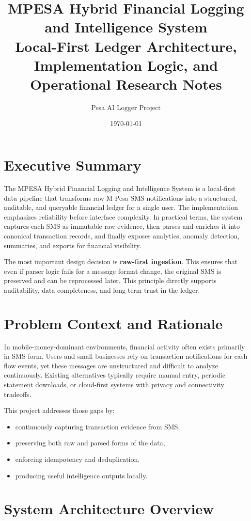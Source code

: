 \documentclass[12pt,a4paper]{article}
\title{MPESA Hybrid Financial Logging and Intelligence System \\
\large Local-First Ledger Architecture, Implementation Logic, and Operational Research Notes}
\author{Pesa AI Logger Project}
\date{\today}
\begin{document}
\maketitle
\tableofcontents
\newpage

\section{Executive Summary}
The MPESA Hybrid Financial Logging and Intelligence System is a local-first data pipeline that transforms raw M-Pesa SMS notifications into a structured, auditable, and queryable financial ledger for a single user. The implementation emphasizes reliability before interface complexity. In practical terms, the system captures each SMS as immutable raw evidence, then parses and enriches it into canonical transaction records, and finally exposes analytics, anomaly detection, summaries, and exports for financial visibility.

The most important design decision is \textbf{raw-first ingestion}. This ensures that even if parser logic fails for a message format change, the original SMS is preserved and can be reprocessed later. This principle directly supports auditability, data completeness, and long-term trust in the ledger.

\section{Problem Context and Rationale}
In mobile-money-dominant environments, financial activity often exists primarily in SMS form. Users and small businesses rely on transaction notifications for cash flow events, yet these messages are unstructured and difficult to analyze continuously. Existing alternatives typically require manual entry, periodic statement downloads, or cloud-first systems with privacy and connectivity tradeoffs.

This project addresses those gaps by:
\begin{itemize}[leftmargin=1.5em]
  \item continuously capturing transaction evidence from SMS,
  \item preserving both raw and parsed forms of the data,
  \item enforcing idempotency and deduplication,
  \item producing useful intelligence outputs locally.
\end{itemize}

\section{System Architecture Overview}
\end{document}
